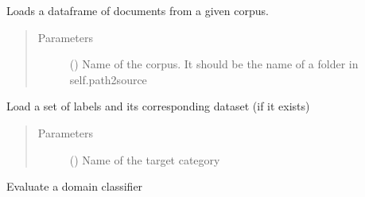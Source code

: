\documentclass[letterpaper,10pt,english]{sphinxmanual}
\begin{document}
\begin{fulllineitems}
\begin{fulllineitems}
\end{fulllineitems}


\begin{fulllineitems}
\label{\detokenize{dc_task_manager:src.task_manager.TaskManager.load_corpus}}
\sphinxAtStartPar
Loads a dataframe of documents from a given corpus.
\begin{quote}\begin{description}
\item[{Parameters}] \leavevmode
\sphinxAtStartPar
{} () \textendash{} Name of the corpus. It should be the name of a folder in
self.path2source

\end{description}\end{quote}

\end{fulllineitems}


\begin{fulllineitems}
\label{\detokenize{dc_task_manager:src.task_manager.TaskManager.load_labels}}
\sphinxAtStartPar
Load a set of labels and its corresponding dataset (if it exists)
\begin{quote}\begin{description}
\item[{Parameters}] \leavevmode
\sphinxAtStartPar
{} () \textendash{} Name of the target category

\end{description}\end{quote}

\end{fulllineitems}


\begin{fulllineitems}
\label{\detokenize{dc_task_manager:src.task_manager.TaskManager.reevaluate_model}}
\sphinxAtStartPar
Evaluate a domain classifier


\end{fulllineitems}
\end{fulllineitems}
\end{document}
